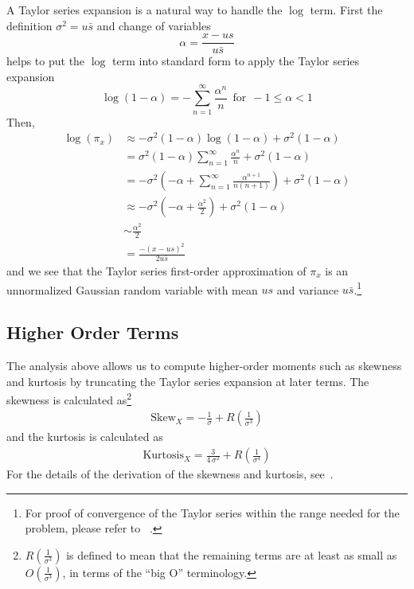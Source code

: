 \documentclass[prodmode,acmtos]{acmsmall}
\begin{document}
A Taylor series expansion is a natural way to handle the $\log$ term.  First the definition $\sigma^2 = u \bar{s}$ and change of variables
\begin{equation*}
\alpha = \frac{x - us}{u\bar{s}}
\end{equation*}
helps to put the $\log$ term into standard form to apply the Taylor series expansion
\begin{equation*}
 \log(1-\alpha) = -
\sum_{n=1}^\infty \frac{\alpha^n}{n} \ \ \text{for} \ \  -1 \le \alpha
< 1
\end{equation*}
Then,
\begin{align}
\log \left( {{\pi _x}} \right)  &\approx -\sigma^2(1-\alpha)\log (1-\alpha)+\sigma^2(1-\alpha) \nonumber \\
&=\sigma^2(1-\alpha)\sum_{n=1}^\infty \frac{\alpha^n}{n}+\sigma^2(1-\alpha) \nonumber \\
&=-\sigma^2 \left( - \alpha +  \sum_{n=1}^\infty
\frac{\alpha^{n+1}}{n(n+1)} \right) + \sigma^2(1-\alpha)\nonumber \\
&\approx -\sigma^2\left(-\alpha+\frac{\alpha^2}{2}\right) + \sigma^2(1-\alpha) \nonumber \\
&\sim \frac{\alpha^2}{2}  \nonumber \\
&= \frac{-(x-us)^2}{2u\bar{s}} \label{eqn:Gaussian_approx}
\end{align}
and we see that the Taylor series first-order approximation of $\pi_x$ is an unnormalized Gaussian random variable with mean $us$ and variance $u\bar{s}$.\footnote{For proof of convergence of the Taylor series within the range needed for the problem, please refer to ~\cite{frankie2012_acmse}.}

\subsection{Higher Order Terms}
The analysis above allows us to compute higher-order moments such as skewness and kurtosis by truncating the Taylor series expansion at later terms.  The skewness is calculated as\footnote{$R\left(\frac{1}{\sigma^3 }\right)$ is defined to mean that the remaining terms are at least as small as $O\left(\frac{1}{\sigma^3 }\right)$, in terms of the ``big O'' terminology.}
\begin{align}
\text{Skew$_X$} = -  \frac{1}{\sigma}  + R\left(\frac{1}{\sigma^3}\right)
\end{align}
and the kurtosis is calculated as
\begin{align}
\text{Kurtosis$_X$} = \frac{3}{4\, \sigma^2} + R\left(\frac{1}{\sigma^4}\right)
\end{align}
For the details of the derivation of the skewness and kurtosis, see~\cite{TashaDissertation}.
\end{document}

